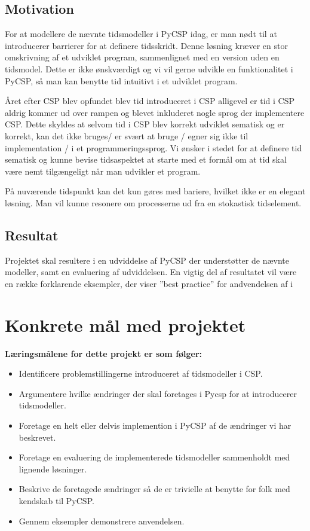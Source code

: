 \subsection{Motivation}
For at modellere de nævnte tidsmodeller i PyCSP idag, er man nødt til at introducerer barrierer for at definere tidsskridt. Denne løsning kræver en stor omskrivning af et udviklet program, sammenlignet med en version uden en tidsmodel. Dette er ikke ønskværdigt og vi vil gerne udvikle en funktionalitet i PyCSP, så man kan benytte tid intuitivt i et udviklet program.

Året efter CSP blev opfundet blev tid introduceret i CSP alligevel er tid i CSP aldrig kommer ud over rampen og blevet inkluderet nogle sprog der implementere CSP. Dette skyldes at selvom tid i CSP blev korrekt udviklet sematisk og er korrekt, kan det ikke bruges/ er svært at bruge / egner sig ikke til implementation / i et programmeringssprog. Vi ønsker i stedet for at definere tid sematisk og kunne bevise tidsaspektet at starte med et formål om at tid skal være nemt tilgængeligt når man udvikler et program.



På nuværende tidspunkt kan det kun gøres med bariere, hvilket ikke er en elegant løsning.
Man vil kunne resonere om processerne ud fra en stokastisk tidselement. 


\subsection{Resultat}
Projektet skal resultere i en udviddelse af PyCSP der understøtter de nævnte modeller, samt en evaluering af udviddelsen. En vigtig del af resultatet vil være en række forklarende eksempler, der viser ''best practice'' for andvendelsen af i  

\section{Konkrete mål med projektet}
\textbf{Læringsmålene for dette projekt er som følger:}

\begin{itemize}
 \item Identificere problemstillingerne introduceret af tidsmodeller i CSP.
 \item Argumentere hvilke ændringer  der skal foretages i Pycsp for at introducerer tidsmodeller.
 \item Foretage en helt eller delvis implemention i PyCSP af de ændringer vi har beskrevet.
 \item Foretage en evaluering de implementerede tidsmodeller sammenholdt med lignende løsninger.
 \item Beskrive de foretagede ændringer så de er trivielle at benytte for folk med kendskab til PyCSP.
 \item Gennem eksempler demonstrere anvendelsen.
\end{itemize}

